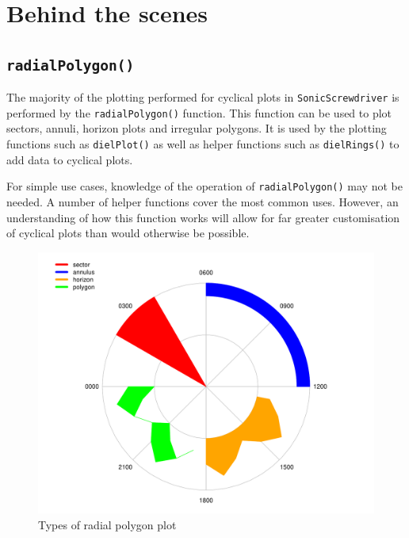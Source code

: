 \documentclass[
]{book}
\begin{document}
\hypertarget{behind-the-scenes}{%
\section{Behind the scenes}\label{behind-the-scenes}}

\hypertarget{radialpolygon}{%
\subsection{\texorpdfstring{\texttt{radialPolygon()}}{radialPolygon()}}\label{radialpolygon}}

The majority of the plotting performed for cyclical plots in \texttt{SonicScrewdriver} is performed by the \texttt{radialPolygon()} function. This function can be used to plot sectors, annuli, horizon plots and irregular polygons. It is used by the plotting functions such as \texttt{dielPlot()} as well as helper functions such as \texttt{dielRings()} to add data to cyclical plots.

For simple use cases, knowledge of the operation of \texttt{radialPolygon()} may not be needed. A number of helper functions cover the most common uses. However, an understanding of how this function works will allow for far greater customisation of cyclical plots than would otherwise be possible.

\begin{figure}

{\centering \includegraphics[width=0.9\linewidth]{_main_files/figure-latex/radialPolygon-types-1} 

}

\caption{Types of radial polygon plot}\label{fig:radialPolygon-types}
\end{figure}
\end{document}
